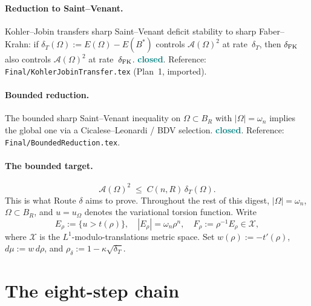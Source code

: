 \documentclass[11pt]{article}
\theoremstyle{definition}
\newcommand{\Om}{\Omega}
\newcommand{\Fr}{\mathcal{A}}
\newcommand{\X}{\mathcal X}
\newcommand{\rdel}{\rho_\delta}
\newcommand{\CLOSED}{\textcolor{teal}{\bf closed}}
\begin{document}
\paragraph{Reduction to Saint--Venant.}  Kohler--Jobin transfers
sharp Saint--Venant deficit stability to sharp Faber--Krahn:
if $\delta_{T}(\Om):=E(\Om)-E(B^{*})$ controls $\Fr(\Om)^{2}$
at rate~$\delta_{T}$, then $\delta_{\rm FK}$ also controls
$\Fr(\Om)^{2}$ at rate~$\delta_{\rm FK}$.  \CLOSED.  Reference:
\texttt{Final/KohlerJobinTransfer.tex} (Plan~1, imported).

\paragraph{Bounded reduction.}  The bounded sharp Saint--Venant
inequality on $\Om\subset B_{R}$ with $|\Om|=\omega_{n}$ implies the
global one via a Cicalese--Leonardi / BDV selection. \CLOSED.
Reference: \texttt{Final/BoundedReduction.tex}.

\paragraph{The bounded target.}
\[
   \Fr(\Om)^{2}\;\le\;C(n,R)\,\delta_{T}(\Om).
\]
This is what Route $\delta$ aims to prove.  Throughout the rest of
this digest, $|\Om|=\omega_{n}$, $\Om\subset B_{R}$, and $u=u_{\Om}$
denotes the variational torsion function.  Write
\[
   E_{\rho}:=\{u>t(\rho)\},\quad |E_{\rho}|=\omega_{n}\rho^{n},\quad
   F_{\rho}:=\rho^{-1}E_{\rho}\in\X,
\]
where $\X$ is the $L^{1}$-modulo-translations metric space.  Set
$w(\rho):=-t'(\rho)$, $d\mu:=w\,d\rho$, and
$\rdel:=1-\kappa\sqrt{\delta_{T}}$.

\section{The eight-step chain}\label{sec:chain}
\end{document}
